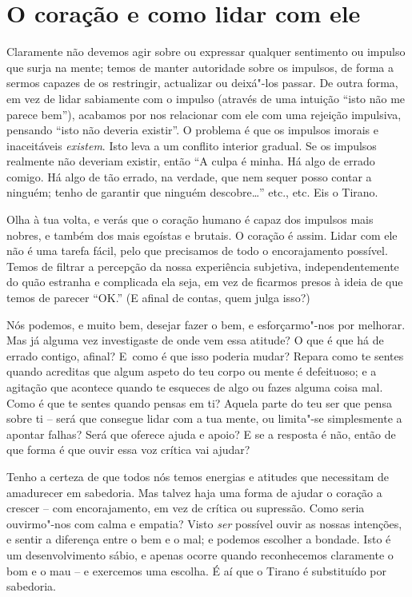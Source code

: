 \section{O coração e como lidar com ele}

Claramente não devemos agir sobre ou expressar qualquer sentimento ou
impulso que surja na mente; temos de manter autoridade sobre os
impulsos, de forma a sermos capazes de os restringir, actualizar ou
deixá"-los passar. De outra forma, em vez de lidar sabiamente com o
impulso (através de uma intuição “isto não me parece bem”), acabamos por
nos relacionar com ele com uma rejeição impulsiva, pensando “isto não
deveria existir”. O problema é que os impulsos imorais e inaceitáveis
\emph{existem}. Isto leva a um conflito interior gradual. Se os impulsos
realmente não deveriam existir, então “A culpa é minha. Há algo de
errado comigo. Há algo de tão errado, na verdade, que nem sequer posso
contar a ninguém; tenho de garantir que ninguém descobre\ldots{}” etc., etc.
Eis o Tirano.

Olha à tua volta, e verás que o coração humano é capaz dos impulsos mais
nobres, e também dos mais egoístas e brutais. O coração é assim. Lidar
com ele não é uma tarefa fácil, pelo que precisamos de todo o
encorajamento possível. Temos de filtrar a percepção da nossa
experiência subjetiva, independentemente do quão estranha e complicada
ela seja, em vez de ficarmos presos à ideia de que temos de parecer
“OK.” (E afinal de contas, quem julga isso?)

Nós podemos, e muito bem, desejar fazer o bem, e esforçarmo"-nos por
melhorar. Mas já alguma vez investigaste de onde vem essa atitude? O que
é que há de errado contigo, afinal? E~como é que isso poderia mudar?
Repara como te sentes quando acreditas que algum aspeto do teu corpo ou
mente é defeituoso; e a agitação que acontece quando te esqueces de algo
ou fazes alguma coisa mal. Como é que te sentes quando pensas em ti?
Aquela parte do teu ser que pensa sobre ti -- será que consegue lidar
com a tua mente, ou limita"-se simplesmente a apontar falhas? Será que
oferece ajuda e apoio? E se a resposta é não, então de que forma é que
ouvir essa voz crítica vai ajudar?

\sectionBreak

Tenho a certeza de que todos nós temos energias e atitudes que
necessitam de amadurecer em sabedoria. Mas talvez haja uma forma de
ajudar o coração a crescer -- com encorajamento, em vez de crítica ou
supressão. Como seria ouvirmo"-nos com calma e empatia? Visto \emph{ser}
possível ouvir as nossas intenções, e sentir a diferença entre o bem e o
mal; e podemos escolher a bondade. Isto é um desenvolvimento sábio, e
apenas ocorre quando reconhecemos claramente o bom e o mau -- e
exercemos uma escolha. É aí que o Tirano é substituído por sabedoria.

